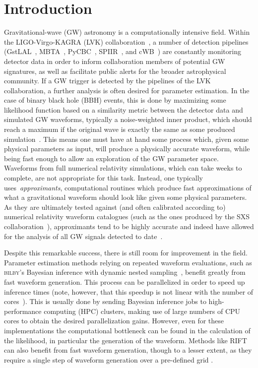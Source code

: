 \documentclass[%
 reprint,
superscriptaddress,
nofootinbib,
 amsmath,amssymb,
 aps,
prd,
floatfix,
]{revtex4-2}
\begin{document}
\section{\label{sec:intro} Introduction}
Gravitational-wave (GW) astronomy is a computationally intensive field. Within the LIGO-Virgo-KAGRA (LVK) collaboration~\cite{aligo_2015,avirgo_2015,kagra_2019}, a number of detection pipelines  (GstLAL~\cite{sachdev2019gstlal}, MBTA~\cite{Aubin_2021}, PyCBC~\cite{Dal_Canton_2021}, SPIIR~\cite{chu2021spiir}, and cWB~\cite{Klimenko_2016}) are constantly monitoring detector data in order to inform collaboration members of potential GW signatures, as well as facilitate public alerts for the broader astrophysical community. If a GW trigger is detected by the pipelines of the LVK collaboration, a further analysis is often desired for parameter estimation. In the case of binary black hole (BBH) events, this is done by maximizing some likelihood function based on a similarity metric between the detector data and simulated GW waveforms, typically a noise-weighted inner product, which should reach a maximum if the original wave is exactly the same as some produced simulation~\cite{Maggiore_book}. 
This means one must have at hand some process which, given some physical parameters as input, will produce a physically accurate waveform, while being fast enough to allow an exploration of the GW parameter space. Waveforms from full numerical relativity simulations, which can take weeks to complete, are not appropriate for this task. Instead, one typically uses~\textit{approximants}, computational routines which produce fast approximations of what a gravitational waveform should look like given some physical parameters. As they are ultimately tested against (and often calibrated according to) numerical relativity waveform catalogues (such as the ones produced by the SXS collaboration~\cite{SXS}), approximants tend to be highly accurate and indeed have allowed for the analysis of all GW signals detected to date~\cite{GWTC-1,GWTC-2,GWTC-2.1,GWTC-3}. 

Despite this remarkable success, there is still room for improvement in the field. Parameter estimation methods relying on repeated waveform evaluations, such as \textsc{bilby}'s Bayesian inference with dynamic nested sampling~\cite{bilby_paper}, benefit greatly from fast waveform generation. This process can be parallelized in order to speed up inference times (note, however, that this speedup is not linear with the number of cores~\cite{dynesty_scaling}). This is usually done by sending Bayesian inference jobs to high-performance computing (HPC) clusters, making use of large numbers of CPU cores to obtain the desired parallelization gains. However, even for these implementations the computational bottleneck can be found in the calculation of the likelihood, in particular the generation of the waveform. Methods like \textsc{RIFT} can also benefit from fast waveform generation, though to a lesser extent, as they require a single step of waveform generation over a pre-defined grid \cite{RIFT}.
\end{document}
